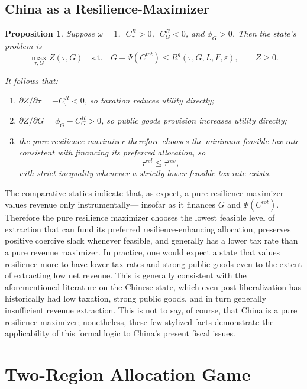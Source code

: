 \documentclass[12pt]{article}
\newtheorem{proposition}{Proposition}
\begin{document}
\subsection{China as a Resilience-Maximizer}

\begin{proposition}\label{prop:pure_resilience}
Suppose $\omega=1$, $\;C^R_\tau>0$, $\;C^R_G<0$, and $\phi_G>0$. Then the state's problem is
\[
\max_{\tau,G} Z(\tau,G)
\quad \text{s.t.} \quad
G+\Psi(C^{tot}) \le R^g(\tau,G,L,F,\varepsilon), \qquad Z\ge 0.
\]

It follows that:
\begin{enumerate}
    \item $\partial Z/\partial \tau = -C^R_\tau <0$, so taxation reduces utility directly;
    
    \item $\partial Z/\partial G = \phi_G - C^R_G >0$, so public goods provision increases utility directly;
    
    \item the pure resilience maximizer therefore chooses the minimum feasible tax rate consistent with financing its preferred allocation, so
    \[
    \tau^{rsl} \le \tau^{rev},
    \]
    with strict inequality whenever a strictly lower feasible tax rate exists.
\end{enumerate}
\end{proposition}

The comparative statics indicate that, as expect, a pure resilience maximizer values revenue only instrumentally--- insofar as it finances $G$ and $\Psi(C^{tot})$. Therefore the pure resilience maximizer chooses the lowest feasible level of extraction that can fund its preferred resilience-enhancing allocation, preserves positive coercive slack whenever feasible, and generally has a lower tax rate than a pure revenue maximizer. In practice, one would expect a state that values resilience more to have lower tax rates and strong public goods even to the extent of extracting low net revenue. This is generally consistent with the aforementioned literature on the Chinese state, which even post-liberalization has historically had low taxation, strong public goods, and in turn generally insufficient revenue extraction. This is not to say, of course, that China is a pure resilience-maximizer; nonetheless, these few stylized facts demonstrate the applicability of this formal logic to China's present fiscal issues.



\section{Two-Region Allocation Game}
\end{document}
